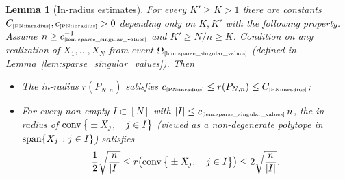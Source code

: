 \documentclass[11pt]{amsart}
\newtheorem{lemma}[theorem]{Lemma}
\theoremstyle{definition}
\theoremstyle{plain}
\def\conv{{\rm conv}}
\newcommand{\tref}[1]{\text{\tiny{\ref{#1}}}}
\begin{document}
\begin{lemma}[In-radius estimates]\label{PN:inradius}
For every $K'\geq K>1$ there are constants
$C_{\text{\tiny\ref{PN:inradius}}},c_{\text{\tiny\ref{PN:inradius}}}>0$
depending only on $K,K'$
with the following property. 
Assume $n\geq c_{\text{\tiny\ref{lem:sparse_singular_values}}}^{-1}$ and $K'\geq N/n\geq K$.
Condition on any realization of $X_1,\dots,X_N$
from event $\Omega_{\text{\tiny\ref{lem:sparse_singular_values}}}$
(defined in Lemma~\ref{lem:sparse_singular_values}).
Then
\begin{itemize}
    \item The in-radius $r(P_{N,n})$
    satisfies $c_{\text{\tiny\ref{PN:inradius}}}\leq r(P_{N,n})
    \leq C_{\text{\tiny\ref{PN:inradius}}}$;
    \item For every non-empty $I\subset[N]$ with $|I|\leq c_{\tref{lem:sparse_singular_values}}\,n$,
    the in-radius of
    $\conv\,\big\{\pm X_j,\quad j\in I\big\}$
    (viewed as a non-degenerate polytope in ${\rm span}\{X_j\,:j \in I\}$)
    satisfies
    $$
    \frac{1}{2}\sqrt{\frac{n}{|I|}}
    \leq 
    r\big(\conv\,\big\{\pm X_j,\quad j\in I\big\}\big)
    \leq 
    2\sqrt{\frac{n}{|I|}}.
    $$
\end{itemize}
\end{lemma}
\end{document}
